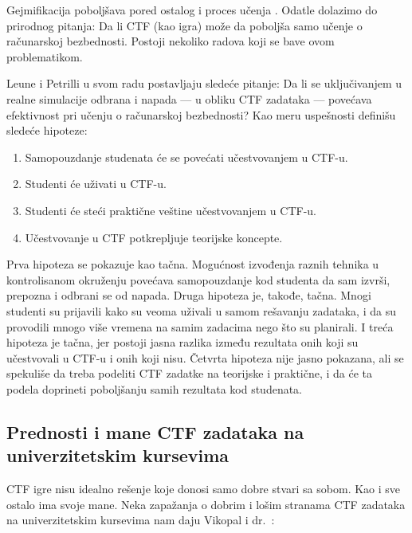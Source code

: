 \documentclass[12pt, a4paper, twocolumn]{article}
\begin{document}
Gejmifikacija poboljšava pored ostalog i proces učenja \cite{gami1, gami2}.
Odatle dolazimo do prirodnog pitanja: Da li CTF (kao igra) može da poboljša
samo učenje o računarskoj bezbednosti. Postoji nekoliko radova koji se bave
ovom problematikom.

Leune i Petrilli \cite{ctf_leune} u svom radu postavljaju sledeće pitanje:
Da li se uključivanjem u realne simulacije odbrana i napada --- u obliku
CTF zadataka --- povećava efektivnost pri učenju o računarskoj bezbednosti?
Kao meru uspešnosti definišu sledeće hipoteze:

\begin{enumerate}
    \item Samopouzdanje studenata će se povećati učestvovanjem u CTF-u.
    \item Studenti će uživati u CTF-u.
    \item Studenti će steći praktične veštine učestvovanjem u CTF-u.
    \item Učestvovanje u CTF potkrepljuje teorijske koncepte.
\end{enumerate}

Prva hipoteza se pokazuje kao tačna. Mogućnost izvođenja raznih tehnika u 
kontrolisanom okruženju povećava samopouzdanje kod studenta da sam izvrši,
prepozna i odbrani se od napada. Druga hipoteza je, takođe, tačna. Mnogi
studenti su prijavili kako su veoma uživali u samom rešavanju zadataka, i
da su provodili mnogo više vremena na samim zadacima nego što su planirali.
I treća hipoteza je tačna, jer postoji jasna razlika između rezultata
onih koji su učestvovali u CTF-u i onih koji nisu. Četvrta hipoteza nije jasno
pokazana, ali se spekuliše da treba podeliti CTF zadatke na teorijske i
praktične, i da će ta podela doprineti poboljšanju samih rezultata kod
studenata.

\subsection{Prednosti i mane CTF zadataka na univerzitetskim kursevima}

CTF igre nisu idealno rešenje koje donosi samo dobre stvari sa sobom.
Kao i sve ostalo ima svoje mane. Neka zapažanja o dobrim i lošim stranama 
CTF zadataka na univerzitetskim kursevima nam daju Vikopal i dr.\ 
\cite{ctf_uni}:
\end{document}
